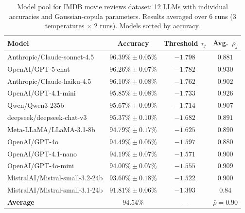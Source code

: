 \documentclass{article}
\theoremstyle{plain}
\theoremstyle{definition}
\theoremstyle{remark}
\begin{document}
\begin{table}[ht]
\centering
\caption{Model pool for IMDB movie reviews dataset: 12 LLMs with individual accuracies and Gaussian-copula parameters. Results averaged over 6 runs (3 temperatures $\times$ 2 runs). Models sorted by accuracy.}
\label{tab:models_imdb}
\small
\begin{tabular}{lccc}
\toprule
\textbf{Model} & \textbf{Accuracy} & \textbf{Threshold $\tau_j$} & \textbf{Avg.\ $\rho_j$} \\
\midrule
Anthropic/Claude-sonnet-4.5    & $96.39\% \pm 0.05\%$ & $-1.798$ & $0.881$ \\
OpenAI/GPT-5-chat              & $96.26\% \pm 0.07\%$ & $-1.782$ & $0.930$ \\
Anthropic/Claude-haiku-4.5     & $96.10\% \pm 0.08\%$ & $-1.762$ & $0.902$ \\
OpenAI/GPT-4.1-mini            & $95.85\% \pm 0.08\%$ & $-1.733$ & $0.926$ \\
Qwen/Qwen3-235b                & $95.67\% \pm 0.09\%$ & $-1.714$ & $0.907$ \\
deepseek/deepseek-chat-v3      & $95.37\% \pm 0.10\%$ & $-1.682$ & $0.891$ \\
Meta-LLaMA/LLaMA-3.1-8b        & $94.79\% \pm 0.17\%$ & $-1.625$ & $0.890$ \\
OpenAI/GPT-4o                  & $94.49\% \pm 0.05\%$ & $-1.597$ & $0.880$ \\
OpenAI/GPT-4.1-nano            & $94.19\% \pm 0.07\%$ & $-1.571$ & $0.900$ \\
OpenAI/GPT-4o-mini             & $94.00\% \pm 0.07\%$ & $-1.555$ & $0.909$ \\
MistralAI/Mistral-small-3.2-24b & $93.60\% \pm 0.18\%$ & $-1.522$ & $0.900$ \\
MistralAI/Mistral-small-3.1-24b & $91.81\% \pm 0.06\%$ & $-1.393$ & $0.84$ \\
\midrule
\textbf{Average} & $94.54\%$ & --- & $\bar{\rho} = 0.90$ \\
\bottomrule
\end{tabular}
\end{table}
\end{document}
